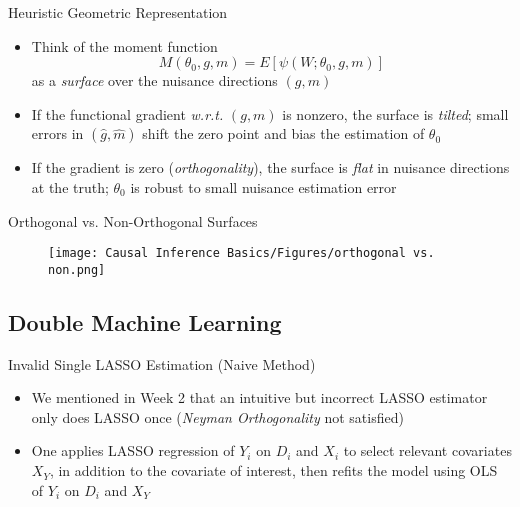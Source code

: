 \documentclass[aspectratio=1610,12pt,xcolor=dvipsnames]{beamer}
\begin{document}
\begin{frame}{Heuristic Geometric Representation}
\begin{itemize}
    \item Think of the moment function
    \[
    M(\theta_0,g,m) = E[\psi(W;\theta_0,g,m)]
    \]
    as a \textit{surface} over the nuisance directions $(g,m)$
    \item If the functional gradient \textit{w.r.t.} $(g,m)$ is nonzero,
    the surface is \textit{tilted}; small errors in $(\hat g,\hat m)$
    shift the zero point and bias the estimation of $\theta_0$
    \item If the gradient is zero (\textit{orthogonality}),
    the surface is \textit{flat} in nuisance directions at the truth;
    $\theta_0$ is robust to small nuisance estimation error
\end{itemize}
\end{frame}

\begin{frame}{Orthogonal vs. Non-Orthogonal Surfaces}
\begin{figure}
    \centering
    \hspace*{-1.6cm} %
    \vspace*{2em} %
    \texttt{[image: Causal Inference Basics/Figures/orthogonal vs. non.png]}
\end{figure}
\end{frame}

\subsection{Double Machine Learning}

\begin{frame}
  \subsectionpage
\end{frame}

\begin{frame}{Invalid Single LASSO Estimation (Naive Method)}

\begin{itemize}
    \item We mentioned in Week 2 that an intuitive but incorrect LASSO estimator only does LASSO once (\textit{Neyman Orthogonality} not satisfied)
    \item One applies LASSO regression of $Y_i$ on $D_i$ and $X_i$ to select relevant covariates $X_Y$, in addition to the covariate of interest, then refits the model using OLS of $Y_i$ on $D_i$ and $X_Y$
\end{itemize}
\end{frame}
\end{document}
